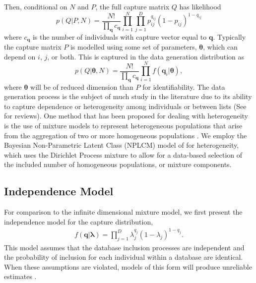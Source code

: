 \documentclass[11pt]{article}\usepackage[]{graphicx}\usepackage[]{color}
\begin{document}
Then, conditional on $N$ and $P$, the full capture matrix $Q$ has likelihood
$$
p(Q | P, N) = \frac{N!}{\prod_{\boldsymbol q} c_{\boldsymbol q}} \prod\limits_{i = 1}^N\prod\limits_{j = 1}^D p_{ij}^{q_{ij}} (1-p_{ij})^{1-q_{ij}}
$$
where $c_{\boldsymbol q}$ is the number of individuals with capture vector equal to $\boldsymbol q$. Typically the capture matrix $P$ is modelled using some set of parameters, $\boldsymbol \theta$, which can depend on $i$, $j$, or both. This is captured in the data generation distribution as
$$
p(Q | \boldsymbol \theta, N) = \frac{N!}{\prod_{\boldsymbol q} c_{\boldsymbol q}} \prod\limits_{i = 1}^Nf(\boldsymbol q_i | \boldsymbol \theta),
$$
where $\boldsymbol \theta$ will be of reduced dimension than $P$ for identifiability. The data generation process is the subject of much study in the literature due to its ability to capture dependence or heterogeneity among individuals or between lists (See \cite{fienberg1999classical,king2001bayesian,king2008bayesian} for reviews). One method that has been proposed for dealing with heterogeneity is the use of mixture models to represent heterogeneous populations that arise from the aggregation of two or more homogeneous populations \citep{norris1996nonparametric,arnold2010capture}. We employ the Bayesian Non-Parametric Latent Class (NPLCM) model of \citep{manrique2016bayesian} for heterogeneity, which uses the Dirichlet Process mixture to allow for a data-based selection of the included number of homogeneous populations, or mixture components.

\subsection{Independence Model}

For comparison to the infinite dimensional mixture model, we first present the independence model for the capture distribution,
\begin{align}
f(\boldsymbol q | \boldsymbol \lambda) = \prod\limits_{j = 1}^D \lambda_j^{q_j}(1-\lambda_j)^{1-q_j}.
\label{crc:indep}
\end{align}
This model assumes that the database inclusion processes are independent and the probability of inclusion for each individual within a database are identical. When these assumptions are violated, models of this form will produce unreliable estimates \citep{fienberg1999classical}.
\end{document}
